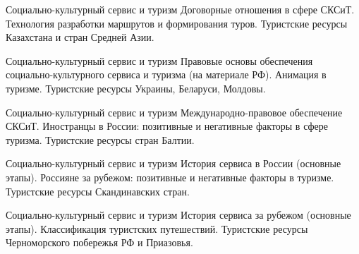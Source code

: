 \documentclass[
	11pt,
	a4paper,
	]
	{article}
\begin{document}
\begin{minipage}[t][\miniH]{\miniL}\centering
	 {Социально-культурный сервис и туризм}
		{
			Договорные отношения в сфере СКСиТ.
		}{
			Технология разработки маршрутов и формирования туров.
		}{
			Туристские ресурсы Казахстана и стран Средней Азии.
		}
	\lowGE
\end{minipage}

\vfill



\begin{minipage}[t][\miniH]{\miniL}\centering
	 {Социально-культурный сервис и туризм}
		{
			Правовые основы обеспечения социально-культурного сервиса и туризма (на материале РФ).
		}{
			Анимация в туризме.
		}{
			Туристские ресурсы Украины, Беларуси, Молдовы.
		}
	\lowGE
\end{minipage}

\vfill



\begin{minipage}[t][\miniH]{\miniL}\centering
	 {Социально-культурный сервис и туризм}
		{
			Международно-правовое обеспечение СКСиТ.
		}{
			Иностранцы в России: позитивные и негативные факторы в сфере туризма.
		}{
			Туристские ресурсы стран Балтии.
		}
	\lowGE
\end{minipage}





\begin{minipage}[t][\miniH]{\miniL}\centering
	 {Социально-культурный сервис и туризм}
		{
			История сервиса в России (основные этапы).
		}{
			Россияне за рубежом: позитивные и негативные факторы в туризме.
		}{
			Туристские ресурсы Скандинавских стран.
		}
	\lowGE
\end{minipage}

\vfill



\begin{minipage}[t][\miniH]{\miniL}\centering
	 {Социально-культурный сервис и туризм}
		{
			История сервиса за рубежом (основные этапы).
		}{
			Классификация туристских путешествий.
		}{
			Туристские ресурсы Черноморского побережья РФ и Приазовья.
		}
	\lowGE
\end{minipage}

\vfill
\end{document}
